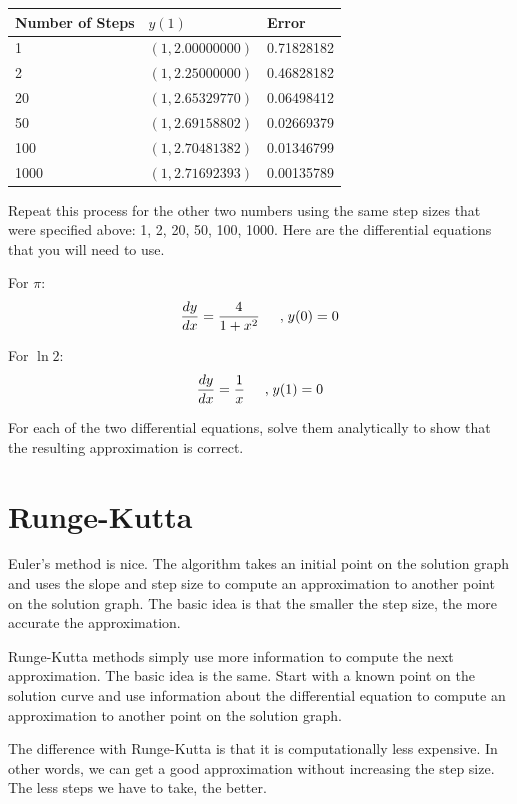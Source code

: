 \documentclass
[justified,nohyper]
{tufte-handout}
\begin{document}
\begin{center}
\begin{tabularx}{\textwidth}{|p{3cm} |p{3cm} |p{3.65cm}|}
	\hline
	Number of Steps & $y(1)$ & Error \\
	\hline
	1 & $(1,2.00000000)$ & 0.71828182 \\
	\hline
	2 & $(1,2.25000000)$ & 0.46828182 \\
	\hline
	20 & $(1,2.65329770)$ & 0.06498412 \\
	\hline
	50 & $(1,2.69158802)$ & 0.02669379 \\
	\hline
	100 & $(1,2.70481382)$ & 0.01346799 \\
	\hline
	1000 & $(1,2.71692393)$ & 0.00135789 \\
	\hline
\end{tabularx}
\end{center}

Repeat this process for the other two numbers using the same step sizes that
were specified above: 1, 2, 20, 50, 100, 1000. Here are the differential
equations that you will need to use.

For $\pi$:
\[
	\dfrac{dy}{dx} = \dfrac{4}{1+x^2} \hspace{0.5cm} \text{,} \; y(0)=0
\]

For $\ln 2$:
\[
	\dfrac{dy}{dx} = \dfrac{1}{x} \hspace{0.5cm} \text{,} \; y(1)=0
\]

For each of the two differential equations, solve them analytically to show
that the resulting approximation is correct.

\section*{Runge-Kutta}
Euler's method is nice. The algorithm takes an initial point on the solution
graph and uses the slope and step size to compute an approximation to another
point on the solution graph.
The basic idea is that the smaller the step size, the more
accurate the approximation.

Runge-Kutta methods simply use more information to compute the next approximation.
The basic idea is the same. Start with a known point on the solution curve and use
information about the differential equation to compute an approximation to
another point on the solution graph.

The difference with Runge-Kutta is that it is computationally less expensive.
In other words, we can get a good approximation without increasing the step size.
The less steps we have to take, the better.
\end{document}
